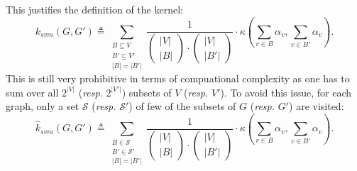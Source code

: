                     This justifies the definition of the kernel:
                    \begin{equation}
                        \label{eq::svm_kernel}
                        k_{svm}(G, G') \triangleq \sum_{\substack{B\subseteq V\\B'\subseteq V'\\\vert B \vert = \vert B' \vert}} \frac{1}{
                            \begin{pmatrix}
                                \vert V \vert\\
                                \vert B \vert                            
                            \end{pmatrix} \cdot \begin{pmatrix}
                                \vert V \vert\\
                                \vert B' \vert                            
                            \end{pmatrix}
                        } \cdot \kappa\left(\sum_{v\in B} \alpha_v, \sum_{v\in B'} \alpha_v\right).
                    \end{equation}
                    This is still very prohibitive in terms of compuational complexity as one has to sum over all $2^{\vert V \vert}$ (\textit{resp.} $2^{\vert V' \vert}$) subsets of $V$ (\textit{resp.} $V'$).
                    To avoid this issue, for each graph, only a set \(\mathscr{S}\) (\textit{resp.} \(\mathscr{S}'\)) of few of the subsets of \(G\) (\textit{resp.} \(G'\)) are visited:
                    \begin{equation}
                        \label{eq::svm_approximated_kernel}
                        \hat{k}_{svm}(G, G') \triangleq \sum_{\substack{B\in \mathscr{S}\\B'\in \mathscr{S}'\\\vert B \vert = \vert B' \vert}} \frac{1}{
                            \begin{pmatrix}
                                \vert V \vert\\
                                \vert B \vert                            
                            \end{pmatrix} \cdot \begin{pmatrix}
                                \vert V \vert\\
                                \vert B' \vert                            
                            \end{pmatrix}
                        } \cdot \kappa\left(\sum_{v\in B} \alpha_v, \sum_{v\in B'} \alpha_v\right).
                    \end{equation}


